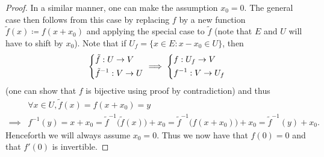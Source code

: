 \begin{proof}
  In a similar manner, one can make the assumption \(x_0 = 0\).
  The general case then follows from this case by replacing \(f\) by a new function
  \(\tilde{f}(x) \coloneqq f(x + x_0)\) and applying the special case to \(\tilde{f}\)
  (note that \(E\) and \(U\) will have to shift by \(x_0\)).
  Note that if \(U_f = \{x \in E : x - x_0 \in U\}\), then
  \[
    \begin{dcases}
      \tilde{f} : U \to V \\
      \tilde{f}^{-1} : V \to U
    \end{dcases} \implies \begin{dcases}
      f : U_f \to V \\
      f^{-1} : V \to U_f
    \end{dcases}
  \]
  (one can show that \(f\) is bijective using proof by contradiction)
  and thus
  \begin{align*}
             & \forall x \in U, \tilde{f}(x) = f(x + x_0) = y                                                                                         \\
    \implies & f^{-1}(y) = x + x_0 = \tilde{f}^{-1}\big(\tilde{f}(x)\big) + x_0 = \tilde{f}^{-1}\big(f(x + x_0)\big) + x_0 = \tilde{f}^{-1}(y) + x_0.
  \end{align*}
  Henceforth we will always assume \(x_0 = 0\).
  Thus we now have that \(f(0) = 0\) and that \(f'(0)\) is invertible.


\end{proof}
